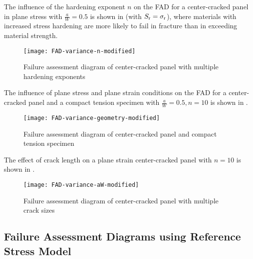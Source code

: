The influence of the hardening exponent \(n\) on the FAD for a center-cracked panel in plane stress with \(\frac{a}{W} = 0.5\) is shown in  (with \(S_{\text{r}} = \sigma_{\textnormal{r}}\)), where materials with increased stress hardening are more likely to fail in fracture than in exceeding material strength.
\begin{figure}
\centering
\texttt{[image: FAD-variance-n-modified]}
\caption[Failure assessment diagram of center-cracked panel with multiple hardening exponents]{\label{fig:fad-ccp-multiple-n} Failure assessment diagram of center-cracked panel with multiple hardening exponents \cite{epri1981}}
\end{figure}
The influence of plane stress and plane strain conditions on the FAD for a center-cracked panel and a compact tension specimen with \(\frac{a}{W} = 0.5, n = 10\) is shown in .
\begin{figure}
\centering
\texttt{[image: FAD-variance-geometry-modified]}
\caption[Failure assessment diagram of center-cracked panel and compact tension specimen]{\label{fig:fad-ccp-ct} Failure assessment diagram of center-cracked panel and compact tension specimen \cite{epri1981}}
\end{figure}
The effect of crack length on a plane strain center-cracked panel with \(n = 10\) is shown in .
\begin{figure}
\centering
\texttt{[image: FAD-variance-aW-modified]}
\caption[Failure assessment diagram of center-cracked panel with multiple crack sizes]{\label{fig:fad-crack-lengths} Failure assessment diagram of center-cracked panel with multiple crack sizes \cite{epri1981}}
\end{figure}

\subsection{Failure Assessment Diagrams using Reference Stress Model}

